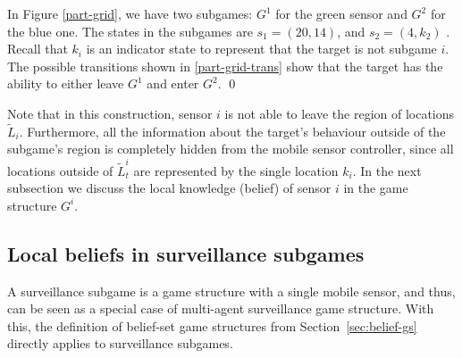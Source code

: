 \begin{example}
In Figure \ref{part-grid}, we have two subgames: $G^1$ for the green sensor and $G^2$ for the blue one. The states in the subgames are $s_1 = (20,14)$, and $s_2 = (4,k_2)$ . Recall that $k_i$ is an indicator state to represent that the target is not subgame $i$. The possible transitions shown in \ref{part-grid-trans} show that the target has the ability to either leave $G^1$ and enter $G^2$. 
\qed
\end{example}

Note that in this construction, sensor $i$ is not able to leave the region of locations $\widetilde{L}_i$. Furthermore, all the information about the target's behaviour outside of  the subgame's region is completely hidden from the mobile sensor controller, since all locations outside of  $\widetilde{L}_t^i$ are represented by the single location $k_i$.
In the next subsection we discuss the local knowledge (belief)  of sensor $i$ in the game structure $G^i$.

\subsection{Local beliefs in surveillance subgames}\label{sec:local-games}
A surveillance subgame is a game structure with a single mobile sensor, and thus, can be seen as a special case of multi-agent surveillance game structure. With this, the definition of  belief-set game structures from Section~\ref{sec:belief-gs} directly applies to surveillance subgames.

